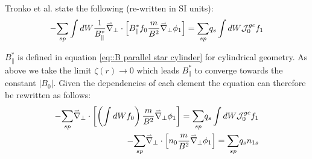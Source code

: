 % 
% 
% 
% 
% 
% 
% 
% 
% 

Tronko et al. \cite{TronkoQuasiNeutrality} state the following (re-written in SI units):
\begin{equation}
 -\underset{sp}{\sum}\int dW \frac{1}{B_\parallel^*}\accentset{\rightharpoonup}{\nabla}_\perp\cdot\left[ B_\parallel^* f_0 \frac{m}{B^2}\accentset{\rightharpoonup}{\nabla}_\perp \phi_1\right] = \underset{sp}{\sum} q_s \int dW \mathcal{J}_0^{gc}f_1
\end{equation}

$B_\parallel^*$ is defined in equation \ref{eq::B parallel star cylinder} for cylindrical geometry. As above we take the limit $\zeta(r)\rightarrow0$ which leads $B_\parallel^*$ to converge towards the constant $|B_0|$. Given the dependencies of each element the equation can therefore be rewritten as follows:
\begin{align}
 -\underset{sp}{\sum} \accentset{\rightharpoonup}{\nabla}_\perp\cdot\left[\left(\int dW f_0\right) \frac{m}{B^2}\accentset{\rightharpoonup}{\nabla}_\perp \phi_1\right] = \underset{sp}{\sum} q_s \int dW \mathcal{J}_0^{gc}f_1\\
 -\underset{sp}{\sum} \accentset{\rightharpoonup}{\nabla}_\perp\cdot\left[n_0 \frac{m}{B^2}\accentset{\rightharpoonup}{\nabla}_\perp \phi_1\right] = \underset{sp}{\sum} q_s n_{1s}
\end{align}

